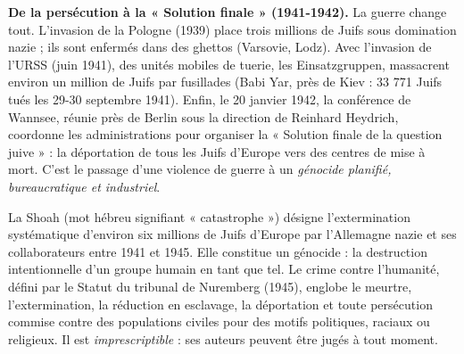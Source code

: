 \documentclass[11pt]{article}
\newcommand{\cle}[1]{{\popxbold\color{popdark}#1}}
\begin{document}
\textbf{De la persécution à la « Solution finale » (1941-1942).} La guerre change tout. L'invasion de la Pologne (1939) place trois millions de Juifs sous domination nazie ; ils sont enfermés dans des ghettos (Varsovie, Lodz). Avec l'invasion de l'URSS (juin 1941), des unités mobiles de tuerie, les \cle{Einsatzgruppen}, massacrent environ un million de Juifs par fusillades (Babi Yar, près de Kiev : 33 771 Juifs tués les 29-30 septembre 1941). Enfin, le 20 janvier 1942, la \cle{conférence de Wannsee}, réunie près de Berlin sous la direction de Reinhard Heydrich, coordonne les administrations pour organiser la « \cle{Solution finale de la question juive} » : la déportation de tous les Juifs d'Europe vers des centres de mise à mort. C'est le passage d'une violence de guerre à un \emph{génocide planifié, bureaucratique et industriel}.

\begin{definition}
La \cle{Shoah} (mot hébreu signifiant « catastrophe ») désigne l'extermination systématique d'environ six millions de Juifs d'Europe par l'Allemagne nazie et ses collaborateurs entre 1941 et 1945. Elle constitue un \cle{génocide} : la destruction intentionnelle d'un groupe humain en tant que tel.
Le \cle{crime contre l'humanité}, défini par le Statut du tribunal de Nuremberg (1945), englobe le meurtre, l'extermination, la réduction en esclavage, la déportation et toute persécution commise contre des populations civiles pour des motifs politiques, raciaux ou religieux. Il est \emph{imprescriptible} : ses auteurs peuvent être jugés à tout moment.
\end{definition}
\end{document}
